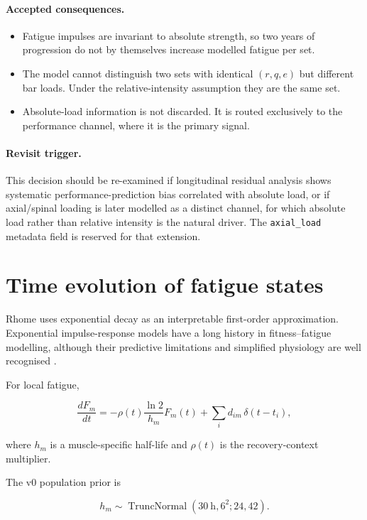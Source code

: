 \documentclass[11pt]{article}
\begin{document}
\paragraph{Accepted consequences.}
\begin{itemize}
    \item Fatigue impulses are invariant to absolute strength, so two years of progression do not by themselves increase modelled fatigue per set.
    \item The model cannot distinguish two sets with identical $(r,q,e)$ but different bar loads. Under the relative-intensity assumption they are the same set.
    \item Absolute-load information is not discarded. It is routed exclusively to the performance channel, where it is the primary signal.
\end{itemize}

\paragraph{Revisit trigger.} This decision should be re-examined if longitudinal residual analysis shows systematic performance-prediction bias correlated with absolute load, or if axial/spinal loading is later modelled as a distinct channel, for which absolute load rather than relative intensity is the natural driver. The \texttt{axial\_load} metadata field is reserved for that extension.

\section{Time evolution of fatigue states}

Rhome uses exponential decay as an interpretable first-order approximation. Exponential impulse-response models have a long history in fitness--fatigue modelling, although their predictive limitations and simplified physiology are well recognised \cite{imbach2022}.

For local fatigue,

\begin{equation}
\frac{dF_m}{dt}=-\rho(t)\frac{\ln 2}{h_m}F_m(t)
+\sum_i d_{im}\,\delta(t-t_i),
\end{equation}

where $h_m$ is a muscle-specific half-life and $\rho(t)$ is the recovery-context multiplier.

The v0 population prior is

\begin{equation}
h_m\sim \operatorname{TruncNormal}(30\ \mathrm{h},6^2;24,42).
\end{equation}
\end{document}
